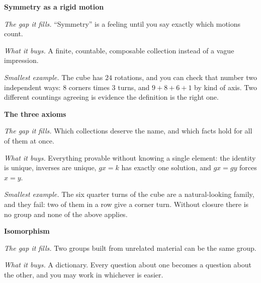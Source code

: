 \documentclass[10pt]{article}
\begin{document}
{\begin{minipage}[t]{744pt}
{
}\par\vspace{5pt}
\begin{minipage}[t]{238pt}\vspace{0pt}
{\sffamily\bfseries\color{big} Symmetry as a rigid motion}\par\vspace{1pt}
\emph{The gap it fills.} ``Symmetry'' is a feeling until you say exactly which motions count.\par\vspace{1pt}
\emph{What it buys.} A finite, countable, composable collection instead of a vague impression.\par\vspace{1pt}
\emph{Smallest example.} The cube has $24$ rotations, and you can check that number two independent ways: $8$ corners times $3$ turns, and $9+8+6+1$ by kind of axis. Two different countings agreeing is evidence the definition is the right one.\par\vspace{5pt}
{\sffamily\bfseries\color{big} The three axioms}\par\vspace{1pt}
\emph{The gap it fills.} Which collections deserve the name, and which facts hold for all of them at once.\par\vspace{1pt}
\emph{What it buys.} Everything provable without knowing a single element: the identity is unique, inverses are unique, $gx=k$ has exactly one solution, and $gx=gy$ forces $x=y$.\par\vspace{1pt}
\emph{Smallest example.} The six quarter turns of the cube are a natural-looking family, and they fail: two of them in a row give a corner turn. Without closure there is no group and none of the above applies.\par\vspace{5pt}
{\sffamily\bfseries\color{big} Isomorphism}\par\vspace{1pt}
\emph{The gap it fills.} Two groups built from unrelated material can be the same group.\par\vspace{1pt}
\emph{What it buys.} A dictionary. Every question about one becomes a question about the other, and you may work in whichever is easier.\par\vspace{1pt}

\end{minipage}
\end{minipage}}
\end{document}
